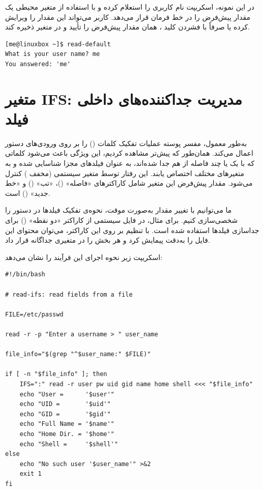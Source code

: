 در این نمونه، اسکریپت نام کاربری را استعلام کرده و با استفاده از متغیر محیطی  یک مقدار پیش‌فرض را در خط فرمان قرار می‌دهد. کاربر می‌تواند این مقدار را ویرایش کرده یا صرفاً با فشردن کلید ، همان مقدار پیش‌فرض را تأیید و در متغیر  ذخیره کند.

\begin{latin}
\begin{lstlisting}
[me@linuxbox ~]$ read-default
What is your user name? me
You answered: 'me'
\end{lstlisting}
\end{latin}

\section{متغیر IFS: مدیریت جداکننده‌های داخلی فیلد}

به‌طور معمول، مفسر پوسته عملیات تفکیک کلمات () را بر روی ورودی‌های دستور  اعمال می‌کند. همان‌طور که پیش‌تر مشاهده کردیم، این ویژگی باعث می‌شود کلماتی که با یک یا چند فاصله از هم جدا شده‌اند، به عنوان فیلدهای مجزا شناسایی شده و به متغیرهای مختلف اختصاص یابند. این رفتار توسط متغیر سیستمی  (مخفف ) کنترل می‌شود. مقدار پیش‌فرض این متغیر شامل کاراکترهای «فاصله» ()، «تب» () و «خط جدید» () است.

ما می‌توانیم با تغییر مقدار  به‌صورت موقت، نحوه‌ی تفکیک فیلدها در دستور  را شخصی‌سازی کنیم. برای مثال، در فایل سیستمی  از کاراکتر «دو نقطه» (\cmd{:}) برای جداسازی فیلدها استفاده شده است. با تنظیم  بر روی این کاراکتر، می‌توان محتوای این فایل را به‌دقت پیمایش کرد و هر بخش را در متغیری جداگانه قرار داد.

اسکریپت زیر نحوه اجرای این فرآیند را نشان می‌دهد:

\begin{latin}
\begin{lstlisting}
#!/bin/bash

# read-ifs: read fields from a file

FILE=/etc/passwd

read -r -p "Enter a username > " user_name

file_info="$(grep "^$user_name:" $FILE)"

if [ -n "$file_info" ]; then
    IFS=":" read -r user pw uid gid name home shell <<< "$file_info"
    echo "User =      '$user'"
    echo "UID =       '$uid'"
    echo "GID =       '$gid'"
    echo "Full Name = '$name'"
    echo "Home Dir. = '$home'"
    echo "Shell =     '$shell'"
else
    echo "No such user '$user_name'" >&2
    exit 1
fi
\end{lstlisting}
\end{latin}

